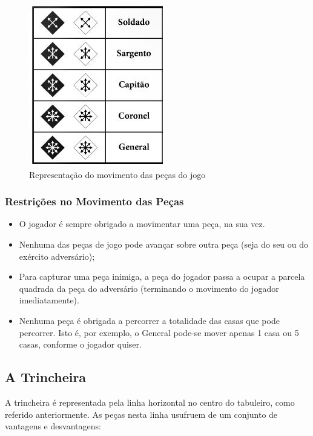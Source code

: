 \begin{figure}[h!]
\begin{center}
\includegraphics[scale=0.5]{img/pieces-movement.jpg}
\caption{Representação do movimento das peças do jogo}
\label{fig:5}
\end{center}
\end{figure}

\subsubsection{Restrições no Movimento das Peças}

\begin{itemize}
	\item O jogador é sempre obrigado a movimentar uma peça, na sua vez.
	\item Nenhuma das peças de jogo pode avançar sobre outra peça (seja do seu ou do exército adversário);
	\item Para capturar uma peça inimiga, a peça do jogador passa a ocupar a parcela quadrada da peça do adversário (terminando o movimento do jogador imediatamente).
	\item Nenhuma peça é obrigada a percorrer a totalidade das casas que pode percorrer. Isto é, por exemplo, o General pode-se mover apenas 1 casa ou 5 casas, conforme o jogador quiser.
\end{itemize}

\newpage

\subsection{A Trincheira}

A trincheira é representada pela linha horizontal no centro do tabuleiro, como referido anteriormente.
As peças nesta linha usufruem de um conjunto de vantagens e desvantagens:


